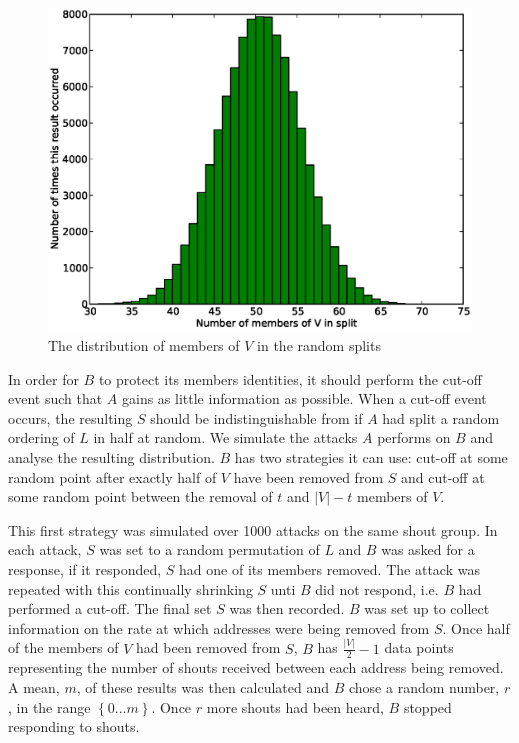 \documentclass[ %
                    author={Luke Murray},
                supervisor={Dr. Simon Hollis},
                     title={Shadow Peer-to-Peer Networks},
                  subtitle={},
                    degree={MEng},
                      year={2013} ]{thesis}
\begin{document}
\begin{figure}[h]
    \centering
    \begin{minipage}[b]{0.6\linewidth}
        \centering
        \includegraphics[width=\linewidth]{diagrams/split_result.eps}
        \caption{The distribution of members of $V$ in the random splits}
    \end{minipage}
    \label{random_split_result}
\end{figure}

In order for $B$ to protect its members identities, it should perform the cut-off event such that $A$ gains as little information as possible. When a cut-off event occurs, the resulting $S$ should be indistinguishable from if $A$ had split a random ordering of $L$ in half at random. We simulate the attacks $A$ performs on $B$ and analyse the resulting distribution. $B$ has two strategies it can use: cut-off at some random point after exactly half of $V$ have been removed from $S$ and cut-off at some random point between the removal of $t$ and $|V| - t$ members of $V$.

This first strategy was simulated over 1000 attacks on the same shout group. In each attack, $S$ was set to a random permutation of $L$ and $B$ was asked for a response, if it responded, $S$ had one of its members removed. The attack was repeated with this continually shrinking $S$ unti $B$ did not respond, i.e. $B$ had performed a cut-off. The final set $S$ was then recorded. $B$ was set up to collect information on the rate at which addresses were being removed from $S$. Once half of the members of $V$ had been removed from $S$, $B$ has $\frac{|V|}{2} - 1$ data points representing the number of shouts received between each address being removed. A mean, $m$, of these results was then calculated and $B$ chose a random number, $r$, in the range $\left\{0 ... m\right\}$. Once $r$ more shouts had been heard, $B$ stopped responding to shouts. 
\end{document}
